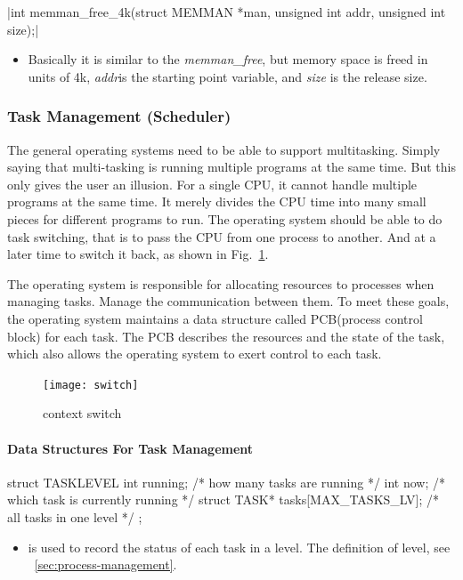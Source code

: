 \documentclass{swfcthesis}
\begin{document}
\csingle|int memman_free_4k(struct MEMMAN *man, unsigned int addr, unsigned int size);|
\begin{itemize}
\item Basically it is similar to the \emph{memman\_free}, but memory space is freed in
  units of 4k, \emph{addr}is the starting point variable, and \emph{size} is the
  release size.
\end{itemize}

\subsubsection{Task Management (Scheduler)}
\label{sec:task-management}

The general operating systems need to be able to support multitasking. Simply saying that
multi-tasking is running multiple programs at the same time. But this only gives the user
an illusion. For a single CPU, it cannot handle multiple programs at the same time. It
merely divides the CPU time into many small pieces for different programs to run. The
operating system should be able to do task switching, that is to pass the CPU from one
process to another. And at a later time to switch it back, as shown in
Fig.~\ref{fig:ctxt-switch}. 

The operating system is responsible for allocating resources to processes when managing
tasks. Manage the communication between them. To meet these goals, the operating system
maintains a data structure called PCB(process control block) for each task. The PCB
describes the resources and the state of the task, which also allows the operating system to
exert control to each task.



\begin{figure}
  \centering
  \begin{center}
    \texttt{[image: switch]}
  \end{center}
  \caption{context switch}
  \label{fig:ctxt-switch}
\end{figure}

\paragraph{Data Structures For Task Management}

\begin{codeblock}[1]
\begin{ccode}
struct TASKLEVEL
{ 
  int running; /* how many tasks are running */
  int now;     /* which task is currently running */
  struct TASK* tasks[MAX_TASKS_LV]; /* all tasks in one level */
};
\end{ccode}
\end{codeblock}
\begin{itemize}
\item is used to record the status of each task in a level. The definition of level, see
  ~\ref{sec:process-management}.
  
  
\end{itemize}
\end{document}
